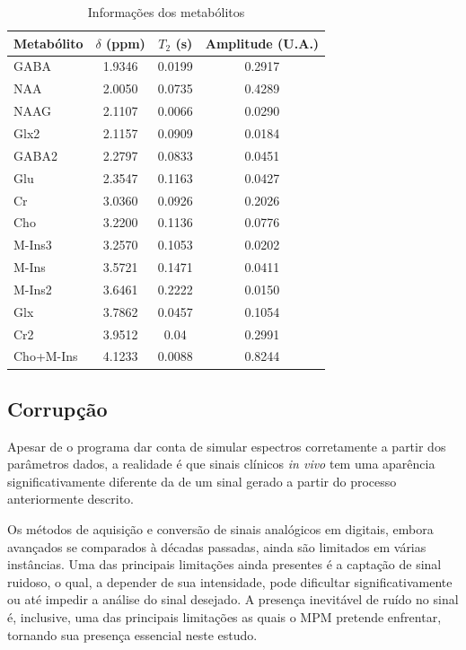 \documentclass{article}
\begin{document}
\begin{table}[H] 
    \centering
    \begin{tabular}{|l|c|c|c|}
    \hline
    Metabólito & $\delta$ (ppm) & $T_2$ (s) & Amplitude (U.A.) \\
    \hline
    GABA & 1.9346 & 0.0199 & 0.2917 \\
    NAA & 2.0050 & 0.0735 & 0.4289 \\
    NAAG & 2.1107 & 0.0066 & 0.0290 \\
    Glx2 & 2.1157 & 0.0909 & 0.0184 \\
    GABA2 & 2.2797 & 0.0833 & 0.0451 \\
    Glu & 2.3547 & 0.1163 & 0.0427 \\
    Cr & 3.0360 & 0.0926 & 0.2026 \\
    Cho & 3.2200 & 0.1136 & 0.0776 \\
    M-Ins3 & 3.2570 & 0.1053 & 0.0202 \\
    M-Ins & 3.5721 & 0.1471 & 0.0411 \\
    M-Ins2 & 3.6461 & 0.2222 & 0.0150 \\
    Glx & 3.7862 & 0.0457 & 0.1054 \\
    Cr2 & 3.9512 & 0.04 & 0.2991 \\
    Cho+M-Ins & 4.1233 & 0.0088 & 0.8244 \\
    \hline
    \end{tabular}
    \caption{Informações dos metabólitos}
    \label{table:1}
\end{table}

\subsection{Corrupção}

Apesar de o programa dar conta de simular espectros corretamente a partir dos parâmetros dados, a realidade é que sinais clínicos \textit{in vivo} tem uma aparência significativamente 
diferente da de um sinal gerado a partir do processo anteriormente descrito. 

Os métodos de aquisição e conversão de sinais analógicos em digitais, embora avançados se comparados à décadas passadas, ainda são limitados em várias instâncias. Uma das principais 
limitações ainda presentes é a captação de sinal ruidoso, o qual, a depender de sua intensidade, pode dificultar significativamente ou até impedir a análise do sinal desejado. A presença 
inevitável de ruído no sinal é, inclusive, uma das principais limitações as quais o MPM pretende enfrentar, tornando sua presença essencial neste estudo. 
\end{document}

